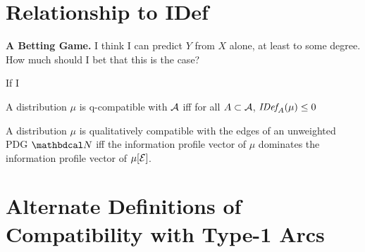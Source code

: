 \documentclass{article}
\begin{document}
\clearpage
\section{Relationship to IDef}

\textbf{A Betting Game.} 
I think I can predict $Y$ from $X$ alone, at least to some degree.
How much should I bet that this is the case?

If I 

\begin{conj}
    A distribution $\mu$ is q-compatible with $\mathcal A$ iff for all $A \subset \mathcal A$, 
    $\mathit{IDef}_{\!A}(\mu) \le 0$
\end{conj}

\begin{conj}
    A distribution $\mu$ is qualitatively compatible with the edges of an unweighted PDG $\dg N$ iff 
    the information profile vector of $\mu$ dominates the information profile vector of $\mu[\mathcal E]$. 
\end{conj}


\appendix
\clearpage
\section{Alternate Definitions of Compatibility with Type-1 Arcs}
\end{document}
